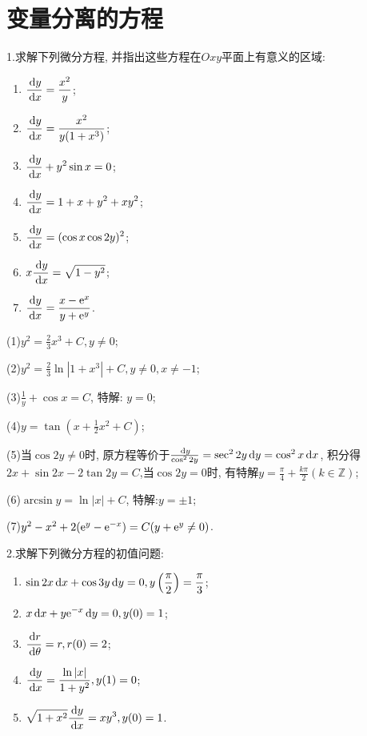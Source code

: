 \section{变量分离的方程}


1.求解下列微分方程, 并指出这些方程在$Oxy$平面上有意义的区域:
\begin{enumerate}[(1)]
\item $\displaystyle\frac{\,\mathrm{d} y}{\,\mathrm{d} x}=\frac{x^2}{y}$;
\item $\displaystyle\frac{\,\mathrm{d} y}{\,\mathrm{d} x}=\frac{x^2}{y(1+x^3)}$;
\item $\displaystyle\frac{\,\mathrm{d} y}{\,\mathrm{d} x}+y^2\sin x=0$;
\item $\displaystyle\frac{\,\mathrm{d} y}{\,\mathrm{d} x}=1+x+y^2+xy^2$;
\item $\displaystyle\frac{\,\mathrm{d} y}{\,\mathrm{d} x}=(\cos x\cos 2y)^2$;
\item $\displaystyle x\frac{\,\mathrm{d} y}{\,\mathrm{d} x}=\sqrt{1-y^2}$;
\item $\displaystyle\frac{\,\mathrm{d} y}{\,\mathrm{d} x}=\frac{x-\mathrm{e}^x}{y+\mathrm{e}^y}$.
\end{enumerate}

\begin{solve}(1)$y^2=\frac{2}{3}x^3+C,y\neq0$;

(2)$y^2=\frac{2}{3}\ln|1+x^3|+C,y\neq0,x\neq-1$;

(3)$\frac{1}{y}+\cos x=C$, 特解: $y=0$;

(4)$y=\tan(x+\frac{1}{2}x^2+C)$;

(5)当$\cos 2y\neq0$时, 原方程等价于$\frac{\,\mathrm{d} y}{\cos^22y}=\sec^22y\,\mathrm{d} y=\cos^2x\,\mathrm{d} x$, 
积分得$2x+\sin2x-2\tan2y=C$,当$\cos2y=0$时, 有特解$y=\frac{\pi}{4}+\frac{k\pi}{2}(k\in\mathbb{Z})$;

(6)$\arcsin y=\ln|x|+C$, 特解:$y=\pm1$;

(7)$y^2-x^2+2(\mathrm{e}^y-\mathrm{e}^{-x})=C(y+\mathrm{e}^y\neq0)$.
\end{solve}


2.求解下列微分方程的初值问题:
\begin{enumerate}[(1)]
\item $\displaystyle\sin 2x\,\mathrm{d} x+\cos 3y\,\mathrm{d} y=0,y\left(\frac{\pi}{2}\right)=\frac{\pi}{3}$;
\item $\displaystyle x\,\mathrm{d} x+y\mathrm{e}^{-x}\,\mathrm{d} y=0,y(0)=1$;
\item $\displaystyle\frac{\,\mathrm{d} r}{\,\mathrm{d}\theta}=r,r(0)=2$;
\item $\displaystyle\frac{\,\mathrm{d} y}{\,\mathrm{d} x}=\frac{\ln|x|}{1+y^2},y(1)=0$;
\item $\displaystyle\sqrt{1+x^2}\frac{\,\mathrm{d} y}{\,\mathrm{d} x}=xy^3,y(0)=1$.
\end{enumerate}

